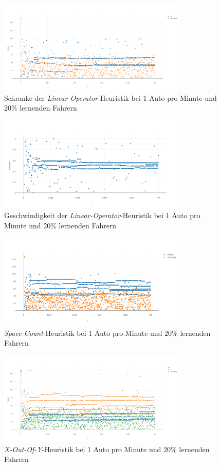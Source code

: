 \begin{figure}[H]
	\includegraphics[width=0.8\textwidth]{analyse/SomeMutants/1pm/linop.png}
	\caption{Schranke der \emph{Linear-Operator}-Heuristik bei 1 Auto pro Minute und $20\%$ lernenden Fahrern}\label{fig:ap_pm_loz_1}
\end{figure}
\begin{figure}[H]
	\includegraphics[width=0.8\textwidth]{analyse/SomeMutants/1pm/linopa1some.png}
	\caption{Geschwindigkeit der \emph{Linear-Operator}-Heuristik bei 1 Auto pro Minute und $20\%$ lernenden Fahrern}\label{fig:ap_pm_loa_1}
\end{figure}
\begin{figure}[H]
	\includegraphics[width=0.8\textwidth]{analyse/SomeMutants/1pm/space1some.png}
	\caption{\emph{Space-Count}-Heuristik bei 1 Auto pro Minute und $20\%$ lernenden Fahrern}\label{fig:ap_pm_sc_1}
\end{figure}
\begin{figure}[H]
	\includegraphics[width=0.8\textwidth]{analyse/SomeMutants/1pm/xy.png}
	\caption{\emph{X-Out-Of-Y}-Heuristik bei 1 Auto pro Minute und $20\%$ lernenden Fahrern}\label{fig:ap_pm_xy_1}
\end{figure}
